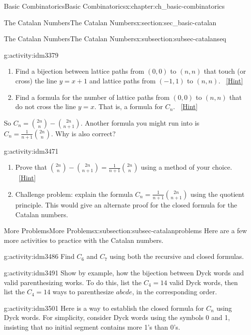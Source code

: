 \documentclass[oneside,10pt,]{book}
\numberwithin{equation}{chapter}
\begin{document}
\begin{chapterptx}{Basic Combinatorics}{}{Basic Combinatorics}{}{}{x:chapter:ch_basic-combinatorics}
\begin{sectionptx}{The Catalan Numbers}{}{The Catalan Numbers}{}{}{x:section:sec_basic-catalan}
\begin{subsectionptx}{The Catalan Numbers}{}{The Catalan Numbers}{}{}{x:subsection:subsec-catalanseq}
\begin{activity}{}{g:activity:idm3379}
\begin{enumerate}[font=\bfseries,label=(\alph*),ref=\alph*]
\item{}Find a bijection between lattice paths from \((0,0)\) to \((n,n)\) that touch (or cross) the line \(y=x+1\) and lattice paths from \((-1,1)\) to \((n,n)\).%
\qquad~\hfill{\tiny\hyperlink{g:hint:idm3417-back}{[Hint]}}\item{}Find a formula for the number of lattice paths from \((0,0)\) to \((n,n)\) that do not cross the line \(y=x\). That is, a formula for \(C_n\).%
\qquad~\hfill{\tiny\hyperlink{g:hint:idm3462-back}{[Hint]}}\end{enumerate}
\end{activity}
So \(C_n = \binom{2n}{n} - \binom{2n}{n+1}\).  Another formula you might run into is \(C_n = \frac{1}{n+1}\binom{2n}{n}\).  Why is also correct?%
\begin{activity}{}{g:activity:idm3471}%
\begin{enumerate}[font=\bfseries,label=(\alph*),ref=\alph*]
\item{}Prove that \(\binom{2n}{n} - \binom{2n}{n+1} = \frac{1}{n+1}\binom{2n}{n}\) using a method of your choice.%
\qquad~\hfill{\tiny\hyperlink{g:hint:idm3476-back}{[Hint]}}\item{}Challenge problem: explain the formula \(C_n = \frac{1}{n+1}\binom{2n}{n+1}\) using the quotient principle.  This would give an alternate proof for the closed formula for the Catalan numbers.%
\end{enumerate}
\end{activity}
\end{subsectionptx}
%
%
\typeout{************************************************}
\typeout{************************************************}
%
\begin{subsectionptx}{More Problems}{}{More Problems}{}{}{x:subsection:subsec-catalanproblems}
Here are a few more activities to practice with the Catalan numbers.%
\begin{activity}{}{g:activity:idm3486}%
Find \(C_6\) and \(C_7\) using both the recursive and closed formulas.%
\end{activity}
\begin{activity}{}{g:activity:idm3491}%
Show by example, how the bijection between Dyck words and valid parenthesizing works.  To do this, list the \(C_4 = 14\) valid Dyck words, then list the \(C_4 = 14\) ways to parenthesize \(abcde\), in the corresponding order.%
\end{activity}
\begin{activity}{}{g:activity:idm3501}%
Here is a way to establish the closed formula for \(C_n\) using Dyck words.  For simplicity, consider Dyck words using the symbols 0 and 1, insisting that no initial segment contains more 1's than 0's.%

\end{activity}
\end{subsectionptx}
\end{sectionptx}
\end{chapterptx}
\end{document}
